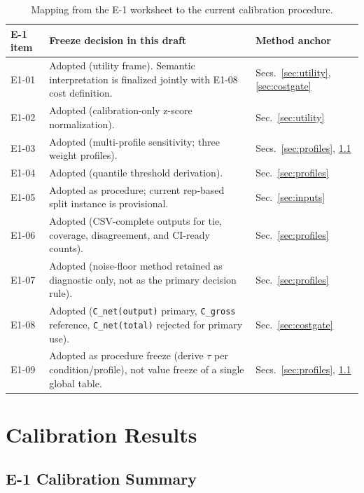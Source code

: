 \documentclass[11pt,a4paper]{article}
\begin{document}
\begin{table}[ht]
\centering
\small
\begin{tabularx}{\textwidth}{@{}lXl@{}}
\toprule
E-1 item & Freeze decision in this draft & Method anchor \\
\midrule
E1-01 & Adopted (utility frame). Semantic interpretation is finalized jointly with E1-08 cost definition. & Secs.~\ref{sec:utility}, \ref{sec:costgate} \\
E1-02 & Adopted (calibration-only z-score normalization). & Sec.~\ref{sec:utility} \\
E1-03 & Adopted (multi-profile sensitivity; three weight profiles). & Secs.~\ref{sec:profiles}, \ref{sec:e1summary} \\
E1-04 & Adopted (quantile threshold derivation). & Sec.~\ref{sec:profiles} \\
E1-05 & Adopted as procedure; current rep-based split instance is provisional. & Sec.~\ref{sec:inputs} \\
E1-06 & Adopted (CSV-complete outputs for tie, coverage, disagreement, and CI-ready counts). & Sec.~\ref{sec:profiles} \\
E1-07 & Adopted (noise-floor method retained as diagnostic only, not as the primary decision rule). & Sec.~\ref{sec:profiles} \\
E1-08 & Adopted (\texttt{C\_net(output)} primary, \texttt{C\_gross} reference, \texttt{C\_net(total)} rejected for primary use). & Sec.~\ref{sec:costgate} \\
E1-09 & Adopted as procedure freeze (derive $\tau$ per condition/profile), not value freeze of a single global table. & Secs.~\ref{sec:profiles}, \ref{sec:e1summary} \\
\bottomrule
\end{tabularx}
\caption{Mapping from the E-1 worksheet to the current calibration procedure.}
\label{tab:e1_map}
\end{table}

\section{Calibration Results}
\label{sec:results}

\subsection{E-1 Calibration Summary}
\label{sec:e1summary}
\end{document}
